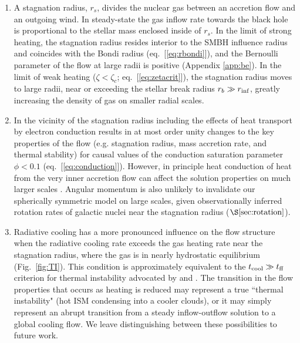 \documentclass[usenatbib,fleqn]{mn2e}
\newcommand{\rs}{r_s}
\begin{document}
  \begin{enumerate}
  \item A stagnation radius, $\rs$, divides the nuclear gas between an
    accretion flow and an outgoing wind. In steady-state the gas inflow
    rate towards the black hole is proportional to the stellar mass
    enclosed inside of $\rs$.  In the limit of strong heating, the
    stagnation radius resides interior to the SMBH influence radius
    and coincides with the Bondi radius (eq.~[\ref{eq:rbondi}]), and
    the Bernoulli parameter of the flow at large radii is positive
    (Appendix \ref{app:be}).  In the limit of weak heating ($\zeta <
    \zeta_c$; eq.~[\ref{eq:zetacrit}]), the stagnation radius moves to
    large radii, near or exceeding the stellar break radius $r_b \gg
    r_{\rm inf}$, greatly increasing the density of gas on smaller
    radial scales.

  \item In the vicinity of the stagnation radius including the effects
    of heat transport by electron conduction results in at most order
    unity changes to the key properties of the flow (e.g. stagnation
    radius, mass accretion rate, and thermal stability) for causal
    values of the conduction saturation parameter $\phi < 0.1$
    (eq.~[\ref{eq:conduction}]). However, in principle heat conduction
    of heat from the very inner accretion flow can affect the solution
    properties on much larger scales \citep{Johnson+2007}. Angular
    momentum is also unlikely to invalidate our spherically symmetric
    model on large scales, given observationally inferred rotation
    rates of galactic nuclei near the stagnation radius
    ($\S\ref{sec:rotation}$).


  \item Radiative cooling has a more pronounced influence on the flow
    structure when the radiative cooling rate exceeds the gas heating
    rate near the stagnation radius, where the gas is in nearly
    hydrostatic equilibrium (Fig.~\ref{fig:TI}).  This condition is
    approximately equivalent to the $t_{\rm cool} \gg t_{\rm ff}$
    criterion for thermal instability advocated by \citet{McCourt+12}
    and \citet{Li&Bryan14a}.  The transition in the flow properties
    that occurs as heating is reduced may represent a true ``thermal
    instability" (hot ISM condensing into a cooler clouds), or it may
    simply represent an abrupt transition from a steady inflow-outflow
    solution to a global cooling flow.  We leave distinguishing
    between these possibilities to future work.


\end{enumerate}
\end{document}
